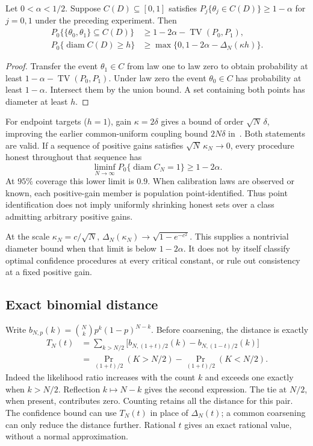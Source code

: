 \documentclass[11pt,a4paper]{article}
\newcommand{\TV}{\operatorname{TV}}
\newcommand{\diam}{\operatorname{diam}}
\begin{document}
\begin{theorem}
Let $0<\alpha<1/2$. Suppose $C(D)\subseteq[0,1]$ satisfies
$P_j\{\theta_j\in C(D)\}\ge1-\alpha$ for $j=0,1$ under the preceding experiment. Then
\begin{align}
 P_0\{\{\theta_0,\theta_1\}\subseteq C(D)\}
 &\ge 1-2\alpha-\TV(P_0,P_1),\label{eq:twoinclusion}\\
 P_0\{\diam C(D)\ge h\}
 &\ge \max\{0,1-2\alpha-\Delta_N(\kappa h)\}.\label{eq:diameter}
\end{align}
\end{theorem}
\begin{proof}
Transfer the event $\theta_1\in C$ from law one to law zero to obtain probability at least $1-\alpha-\TV(P_0,P_1)$. Under law zero the event $\theta_0\in C$ has probability at least $1-\alpha$. Intersect them by the union bound. A set containing both points has diameter at least $h$.
\end{proof}

For endpoint targets ($h=1$), gain $\kappa=2\delta$ gives a bound of order $\sqrt N\,\delta$, improving the earlier common-uniform coupling bound $2N\delta$ in~\cite[Theorem 6]{justusJoint}. Both statements are valid. If a sequence of positive gains satisfies $\sqrt N\,\kappa_N\to0$, every procedure honest throughout that sequence has
\[
 \liminf_{N\to\infty}P_0\{\diam C_N=1\}\ge1-2\alpha.
\]
At $95\%$ coverage this lower limit is $0.9$. When calibration laws are observed or known, each positive-gain member is population point-identified. Thus point identification does not imply uniformly shrinking honest sets over a class admitting arbitrary positive gains.

At the scale $\kappa_N=c/\sqrt N$, $\Delta_N(\kappa_N)\to\sqrt{1-e^{-c^2}}$. This supplies a nontrivial diameter bound when that limit is below $1-2\alpha$. It does not by itself classify optimal confidence procedures at every critical constant, or rule out consistency at a fixed positive gain.

\subsection{Exact binomial distance}

Write $b_{N,p}(k)=\binom Nk p^k(1-p)^{N-k}$. Before coarsening, the distance is exactly
\begin{align}
 T_N(t)
 &=\sum_{k>N/2}\bigl[b_{N,(1+t)/2}(k)-b_{N,(1-t)/2}(k)\bigr]\label{eq:exacttv}\\
 &=\Pr_{(1+t)/2}(K>N/2)-\Pr_{(1+t)/2}(K<N/2).\nonumber
\end{align}
Indeed the likelihood ratio increases with the count $k$ and exceeds one exactly when $k>N/2$. Reflection $k\mapsto N-k$ gives the second expression. The tie at $N/2$, when present, contributes zero. Counting retains all the distance for this pair. The confidence bound can use $T_N(t)$ in place of $\Delta_N(t)$; a common coarsening can only reduce the distance further. Rational $t$ gives an exact rational value, without a normal approximation.
\end{document}
